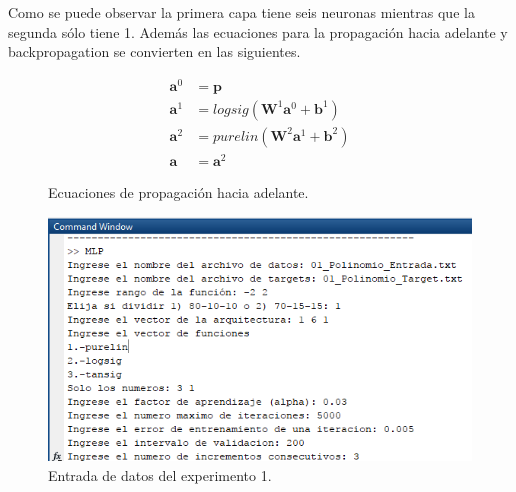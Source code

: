Como se puede observar la primera capa tiene seis neuronas mientras que la segunda sólo tiene 1. Además las ecuaciones para la propagación hacia adelante y backpropagation se convierten en las siguientes.
\begin{figure}[H]
    \begin{align*}
        \boldsymbol{a}^0 &= \boldsymbol{p} \\
        \boldsymbol{a}^{1} &= logsig(\boldsymbol{W}^{1}\boldsymbol{a}^{0}+\boldsymbol{b}^{1}
        ) \\
        \boldsymbol{a}^{2} &= purelin(\boldsymbol{W}^{2}\boldsymbol{a}^{1}+\boldsymbol{b}^{2}
        ) \\
        \boldsymbol{a} &= \boldsymbol{a}^{2}
    \end{align*}
    \caption{Ecuaciones de propagación hacia adelante.}
\end{figure}
\begin{figure}[H]
    \begin{center}
        \includegraphics[width=14cm]{1/entrada.png}
        \caption{Entrada de datos del experimento 1.}
        \label{fig:entrada1}
    \end{center}
\end{figure}

